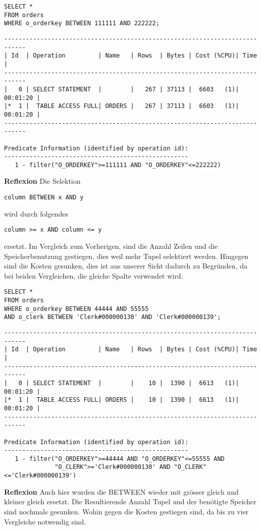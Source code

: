 \documentclass[10pt]{article}
\begin{document}
\begin{lstlisting}[style=sql]
SELECT *
FROM orders
WHERE o_orderkey BETWEEN 111111 AND 222222;
\end{lstlisting}
\begin{lstlisting}[style=queryexecutionplan]
----------------------------------------------------------------------------
| Id  | Operation         | Name   | Rows  | Bytes | Cost (%CPU)| Time     |
----------------------------------------------------------------------------
|   0 | SELECT STATEMENT  |        |   267 | 37113 |  6603   (1)| 00:01:20 |
|*  1 |  TABLE ACCESS FULL| ORDERS |   267 | 37113 |  6603   (1)| 00:01:20 |
----------------------------------------------------------------------------

Predicate Information (identified by operation id):
---------------------------------------------------
   1 - filter("O_ORDERKEY">=111111 AND "O_ORDERKEY"<=222222)
\end{lstlisting}
\textbf{Reflexion} \newline
Die Selektion 
\begin{lstlisting}[style=sqlNoTitle]
column BETWEEN x AND y 
\end{lstlisting}
wird durch folgendes 
\begin{lstlisting}[style=sqlNoTitle]
column >= x AND column <= y 
\end{lstlisting}
ersetzt. Im Vergleich zum Vorherigen, sind die Anzahl Zeilen und die 
Speicherbenutzung gestiegen, dies weil mehr Tupel selektiert werden. Hingegen 
sind die Kosten gesunken, dies ist aus unserer Sicht dadurch zu Begründen, da 
bei beiden Vergleichen, die gleiche Spalte verwendet wird.

\begin{lstlisting}[style=sql]
SELECT *
FROM orders
WHERE o_orderkey BETWEEN 44444 AND 55555
AND o_clerk BETWEEN 'Clerk#000000130' AND 'Clerk#000000139';
\end{lstlisting}
\begin{lstlisting}[style=queryexecutionplan]
----------------------------------------------------------------------------
| Id  | Operation         | Name   | Rows  | Bytes | Cost (%CPU)| Time     |
----------------------------------------------------------------------------
|   0 | SELECT STATEMENT  |        |    10 |  1390 |  6613   (1)| 00:01:20 |
|*  1 |  TABLE ACCESS FULL| ORDERS |    10 |  1390 |  6613   (1)| 00:01:20 |
----------------------------------------------------------------------------

Predicate Information (identified by operation id):
---------------------------------------------------
   1 - filter("O_ORDERKEY">=44444 AND "O_ORDERKEY"<=55555 AND 
              "O_CLERK">='Clerk#000000130' AND "O_CLERK"<='Clerk#000000139')
\end{lstlisting}
\textbf{Reflexion} \newline
Auch hier wurden die BETWEEN wieder mit grösser gleich und kleiner gleich ersetzt. 
Die Resultierende Anzahl Tupel und der benötigte Speicher sind nochmals gesunken. 
Wohin gegen die Kosten gestiegen sind, da bis zu vier Vergleiche notwendig sind.
\end{document}
